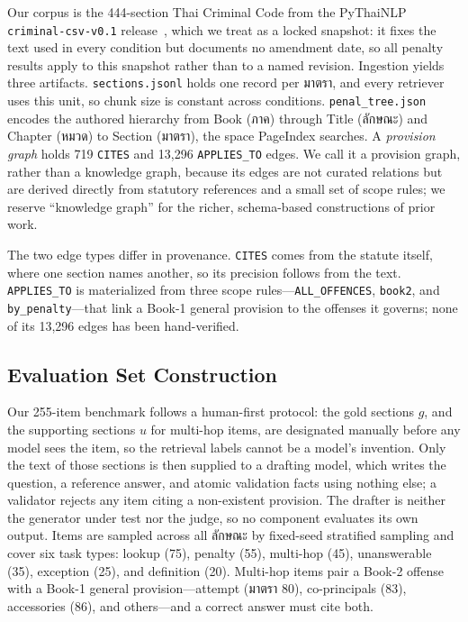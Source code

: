 \documentclass[conference]{IEEEtran}
\providecommand{\TH}{}\renewcommand{\TH}[1]{{\thaifont #1}}
\begin{document}
Our corpus is the 444-section Thai Criminal Code from the PyThaiNLP \texttt{criminal-csv-v0.1}
release~\cite{pythainlpthailaw}, which we treat as a locked snapshot: it fixes the text used in every
condition but documents no amendment date, so all penalty results apply to this snapshot rather than
to a named revision. Ingestion yields three artifacts. \texttt{sections.jsonl} holds one record per
\TH{มาตรา}, and every retriever uses this unit, so chunk size is constant across conditions.
\texttt{penal\_tree.json} encodes the authored hierarchy from Book (\TH{ภาค}) through Title
(\TH{ลักษณะ}) and Chapter (\TH{หมวด}) to Section (\TH{มาตรา}), the space PageIndex searches. A
\emph{provision graph} holds 719 \texttt{CITES} and 13,296 \texttt{APPLIES\_TO} edges. We call it a
provision graph, rather than a knowledge graph, because its edges are not curated relations but are
derived directly from statutory references and a small set of scope rules; we reserve ``knowledge
graph'' for the richer, schema-based constructions of prior work.

The two edge types differ in provenance. \texttt{CITES} comes from the statute itself, where one
section names another, so its precision follows from the text. \texttt{APPLIES\_TO} is
materialized from three scope rules---\texttt{ALL\_OFFENCES}, \texttt{book2}, and
\texttt{by\_penalty}---that link a Book-1 general provision to the offenses it governs; none of
its 13,296 edges has been hand-verified.

\subsection{Evaluation Set Construction}
\label{sec:evalset}

Our 255-item benchmark follows a human-first protocol: the gold sections $g$, and the supporting
sections $u$ for multi-hop items, are designated manually before any model sees the item, so the
retrieval labels cannot be a model's invention. Only the text of those sections is then supplied to a
drafting model, which writes the question, a reference answer, and atomic validation facts using
nothing else; a validator rejects any item citing a non-existent provision. The drafter is neither
the generator under test nor the judge, so no component evaluates its own output. Items are sampled
across all \TH{ลักษณะ} by fixed-seed stratified sampling and cover six task types: lookup (75),
penalty (55), multi-hop (45), unanswerable (35), exception (25), and definition (20). Multi-hop
items pair a Book-2 offense with a Book-1 general provision---attempt (\TH{มาตรา} 80),
co-principals (83), accessories (86), and others---and a correct answer must cite both.
\end{document}
